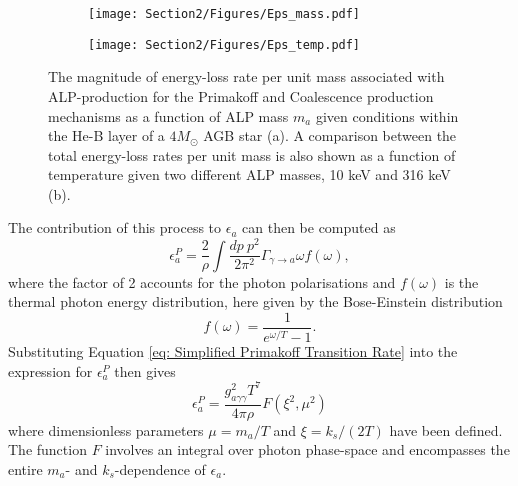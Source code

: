 \begin{figure}[t]
    \centering
    \begin{subfigure}[t]{0.5\textwidth}
        \centering
        \texttt{[image: Section2/Figures/Eps\_mass.pdf]}
        \caption{}
        \label{fig: Eps_processcomp}
    \end{subfigure}%
    \begin{subfigure}[t]{0.5\textwidth}
         \centering
         \texttt{[image: Section2/Figures/Eps\_temp.pdf]}
         \caption{}
         \label{fig: Eps_masscomp}
     \end{subfigure}
    \caption{The magnitude of energy-loss rate per unit mass associated with ALP-production for the Primakoff and Coalescence production mechanisms as a function of ALP mass $m_a$ given conditions within the He-B layer of a $4M_{\odot}$ AGB star (a). A comparison between the total energy-loss rates per unit mass is also shown as a function of temperature given two different ALP masses, 10 keV and 316 keV (b).}
    \label{fig: Fig2}
\end{figure}

The contribution of this process to $\epsilon_a$ can then be computed as \cite{Raffelt-Bounds-on-light, Raffelt:1996wa}
\begin{equation}
    \epsilon_a^P=\frac{2}{\rho}\int\frac{dp\ p^2}{2\pi^2}\Gamma_{\gamma\rightarrow a}\omega f(\omega),
\end{equation}
where the factor of 2 accounts for the photon polarisations and $f(\omega)$ is the thermal photon energy distribution, here given by the Bose-Einstein distribution \cite{DiLella:2000dn}
\begin{equation}
    f(\omega)=\frac{1}{e^{\omega/T}-1}.
\end{equation}
Substituting Equation \ref{eq: Simplified Primakoff Transition Rate} into the expression for $\epsilon_a^P$ then gives
\begin{equation}
    \epsilon_a^P=\frac{g_{a\gamma\gamma}^2T^7}{4\pi\rho}F(\xi^2, \mu^2)
    \label{eq: F function}
\end{equation}
where dimensionless parameters $\mu=m_a/T$ and $\xi=k_s/(2T)$ have been defined. The function $F$ involves an integral over photon phase-space and encompasses the entire $m_a$- and $k_s$-dependence of $\epsilon_a$. 







